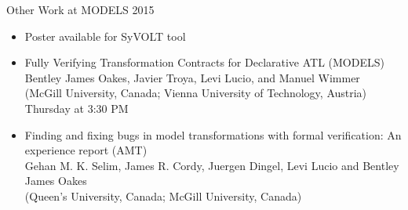 \documentclass[xcolor=dvipsnames, 12pt, handout]{beamer}
\begin{document}
\begin{frame}{Other Work at MODELS 2015}
\small
\begin{itemize}[<+->]
\item Poster available for SyVOLT tool
\item Fully Verifying Transformation Contracts for Declarative ATL (MODELS)\\
Bentley James Oakes, Javier Troya, Levi Lucio, and Manuel Wimmer\\
(McGill University, Canada; Vienna University of Technology, Austria)\\
Thursday at 3:30 PM
\item  Finding and fixing bugs in model transformations with formal verification: An experience report (AMT)\\
Gehan M. K. Selim, James R. Cordy, Juergen Dingel, Levi Lucio and Bentley James Oakes\\
(Queen's University, Canada; McGill University, Canada) 
\end{itemize}
\end{frame}









\end{document}
